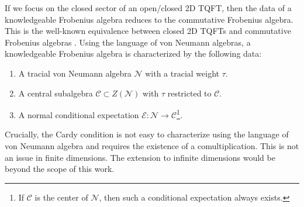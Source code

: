 \documentclass[a4paper,11pt]{article}
\theoremstyle{definition}
\numberwithin{equation}{section}
\begin{document}
If we focus on the closed sector of an open/closed 2D TQFT, then the data of a knowledgeable Frobenius algebra reduces to the commutative Frobenius algebra. This is the well-known equivalence between closed 2D TQFTs and commutative Frobenius algebras \cite{frobeniusTQFT2}. Using the language of von Neumann algebras, a knowledgeable Frobenius algebra is characterized by the following data:
\begin{enumerate}
    \item A tracial von Neumann algebra $\mathcal{N}$ with a tracial weight $\tau$.
    \item A central subalgebra $\mathcal{C}\subset Z(\mathcal{N})$ with $\tau$ restricted to $\mathcal{C}$.
    \item A normal conditional expectation $\mathcal{E}:\mathcal{N}\rightarrow \mathcal{C}$\footnote{If $\mathcal{C}$ is the center of $\mathcal{N}$, then such a conditional expectation always exists.}.
\end{enumerate}
Crucially, the Cardy condition is not easy to characterize using the language of von Neumann algebra and requires the existence of a comultiplication. This is not an issue in finite dimensions. The extension to infinite dimensions would be beyond the scope of this work.
\end{document}
